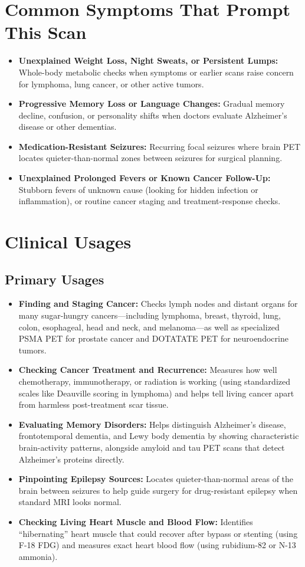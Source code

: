 \section{Common Symptoms That Prompt This Scan}
\begin{itemize}
    \item \textbf{Unexplained Weight Loss, Night Sweats, or Persistent Lumps:} Whole-body metabolic checks when symptoms or earlier scans raise concern for lymphoma, lung cancer, or other active tumors.
    \item \textbf{Progressive Memory Loss or Language Changes:} Gradual memory decline, confusion, or personality shifts when doctors evaluate Alzheimer's disease or other dementias.
    \item \textbf{Medication-Resistant Seizures:} Recurring focal seizures where brain PET locates quieter-than-normal zones between seizures for surgical planning.
    \item \textbf{Unexplained Prolonged Fevers or Known Cancer Follow-Up:} Stubborn fevers of unknown cause (looking for hidden infection or inflammation), or routine cancer staging and treatment-response checks.
\end{itemize}

\section{Clinical Usages}

\subsection{Primary Usages}

\begin{itemize}
    \item \textbf{Finding and Staging Cancer:} Checks lymph nodes and distant organs for many sugar-hungry cancers---including lymphoma, breast, thyroid, lung, colon, esophageal, head and neck, and melanoma---as well as specialized PSMA PET for prostate cancer and DOTATATE PET for neuroendocrine tumors.
    \item \textbf{Checking Cancer Treatment and Recurrence:} Measures how well chemotherapy, immunotherapy, or radiation is working (using standardized scales like Deauville scoring in lymphoma) and helps tell living cancer apart from harmless post-treatment scar tissue.
    \item \textbf{Evaluating Memory Disorders:} Helps distinguish Alzheimer's disease, frontotemporal dementia, and Lewy body dementia by showing characteristic brain-activity patterns, alongside amyloid and tau PET scans that detect Alzheimer's proteins directly.
    \item \textbf{Pinpointing Epilepsy Sources:} Locates quieter-than-normal areas of the brain between seizures to help guide surgery for drug-resistant epilepsy when standard MRI looks normal.
    \item \textbf{Checking Living Heart Muscle and Blood Flow:} Identifies ``hibernating'' heart muscle that could recover after bypass or stenting (using F-18 FDG) and measures exact heart blood flow (using rubidium-82 or N-13 ammonia).
\end{itemize}

